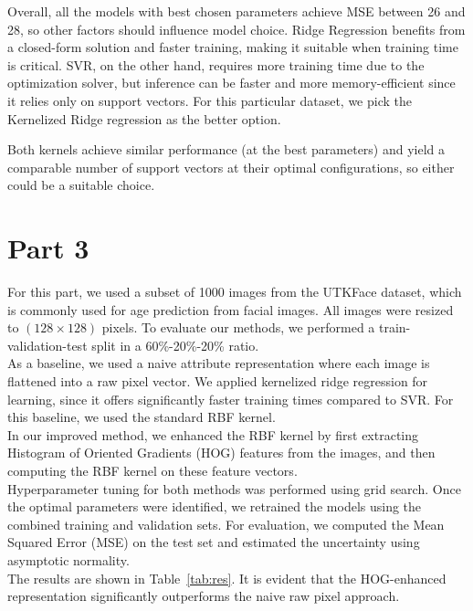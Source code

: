 \documentclass[9pt]{IEEEtran}
\begin{document}
Overall, all the models with best chosen parameters
 achieve MSE between 26 and 28, so other factors 
should influence model choice. Ridge Regression benefits from a closed-form 
solution and faster training, making it suitable when training time is 
critical. SVR, on the other hand, requires more training time due to the
 optimization solver, but inference can be faster and more memory-efficient 
 since it relies only on support vectors. For this particular dataset, we pick 
 the Kernelized Ridge regression as the better option. 

Both kernels achieve similar performance (at the best parameters) and yield a comparable number 
of support vectors at their optimal configurations, so either could be a
 suitable choice.

 \newpage
\section{Part 3}
For this part, we used a subset of 1000 images from the UTKFace dataset, which is commonly used 
for age prediction from facial images. All images were resized to $(128 \times 128)$ pixels. 
To evaluate our methods, we performed a train-validation-test split in a 60\%-20\%-20\% ratio.
\\

As a baseline, we used a naive attribute representation where each image is flattened into a 
raw pixel vector. We applied kernelized ridge regression for learning, since it offers significantly 
faster training times compared to SVR. For this baseline, we used the standard
RBF kernel.
\\

In our improved method, we enhanced the RBF kernel by first extracting Histogram of Oriented Gradients (HOG) features from the images, and then computing the RBF kernel on these feature vectors.
\\

Hyperparameter tuning for both methods was performed using grid search. Once the optimal parameters were identified, we retrained the models using the combined training and validation sets. For evaluation, we computed the Mean Squared Error (MSE) on the test set and estimated the uncertainty using asymptotic normality.
\\

The results are shown in Table~\ref{tab:res}. It is evident that the HOG-enhanced representation significantly 
outperforms the naive raw pixel approach.
\end{document}

